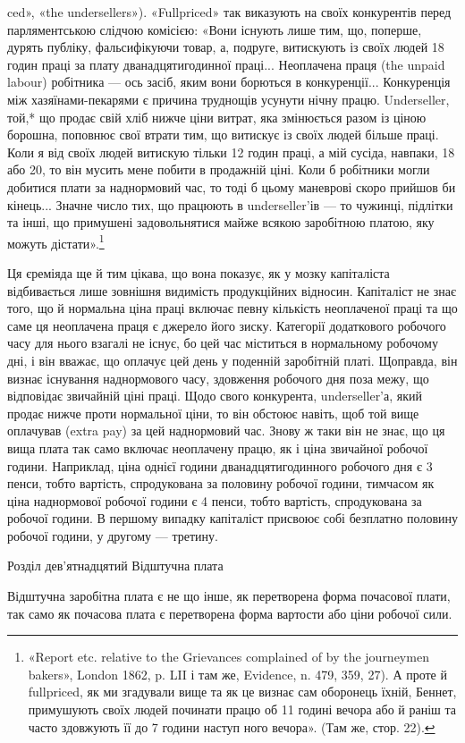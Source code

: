 ced», «the undersellers»). «Fullpriced» так виказують на своїх
конкурентів перед парляментською слідчою комісією: «Вони
існують лише тим, що, поперше, дурять публіку, фальсифікуючи
товар, а, подруге, витискують із своїх людей 18 годин праці
за плату дванадцятигодинної праці... Неоплачена праця (the
unpaid labour) робітника — ось засіб, яким вони борються в
конкуренції... Конкуренція між хазяїнами-пекарями є причина
труднощів усунути нічну працю. Underseller, той,* що продає
свій хліб нижче ціни витрат, яка змінюється разом із ціною
борошна, поповнює свої втрати тим, що витискує із своїх людей
більше праці. Коли я від своїх людей витискую тільки 12 годин
праці, а мій сусіда, навпаки, 18 або 20, то він мусить мене побити
в продажній ціні. Коли б робітники могли добитися плати за
наднормовий час, то тоді б цьому маневрові скоро прийшов би
кінець... Значне число тих, що працюють в underseller’ів — то
чужинці, підлітки та інші, що примушені задовольнятися майже
всякою заробітною платою, яку можуть дістати».\footnote{
«Report etc. relative to the Grievances complained of by the
journeymen bakers», London 1862, p. LII і там же, Evidence, n. 479,
359, 27). А проте й fullpriced, як ми згадували вище та як це визнає сам
оборонець їхній, Беннет, примушують своїх людей починати працю об
11 годині вечора або й раніш та часто здовжують її до 7 години наступ
ного вечора». (Там же, стор. 22).
}

Ця єреміяда ще й тим цікава, що вона показує, як у мозку
капіталіста відбивається лише зовнішня видимість продукційних
відносин. Капіталіст не знає того, що й нормальна ціна праці
включає певну кількість неоплаченої праці та що саме ця неоплачена
праця є джерело його зиску. Категорії додаткового робочого
часу для нього взагалі не існує, бо цей час міститься в нормальному
робочому дні, і він вважає, що оплачує цей день у поденній
заробітній платі. Щоправда, він визнає існування наднормового
часу, здовження робочого дня поза межу, що відповідає звичайній
ціні праці. Щодо свого конкурента, underseller’а, який продає
нижче проти нормальної ціни, то він обстоює навіть, щоб той
вище оплачував (extra pay) за цей наднормовий час. Знову ж
таки він не знає, що ця вища плата так само включає неоплачену
працю, як і ціна звичайної робочої години. Наприклад,
ціна однієї години дванадцятигодинного робочого дня є 3 пенси,
тобто вартість, спродукована за половину робочої години, тимчасом
як ціна наднормової робочої години є 4 пенси, тобто вартість,
спродукована за  робочої години. В першому випадку капіталіст
присвоює собі безплатно половину робочої години, у
другому — третину.

Розділ дев’ятнадцятий
Відштучна плата

Відштучна заробітна плата є не що інше, як перетворена
форма почасової плати, так само як почасова плата є перетворена
форма вартости або ціни робочої сили.